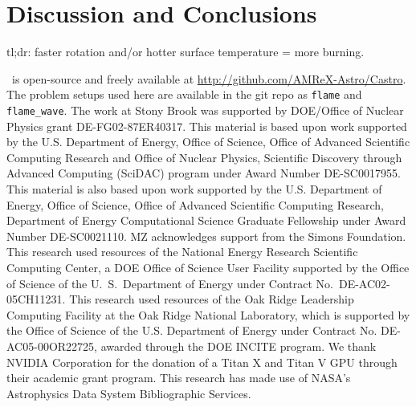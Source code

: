 \documentclass[preprint,times,tighten]{aastex63}
\newcommand{\castro}{{\sf Castro}}
\begin{document}
\section{Discussion and Conclusions}\label{Sec:conclusions}

tl;dr: faster rotation and/or hotter surface temperature = more burning.

\acknowledgements \castro\ is open-source and freely available at
\url{http://github.com/AMReX-Astro/Castro}.  The problem setups used
here are available in the git repo as {\tt flame} and {\tt
  flame\_wave}.  The work at Stony Brook was supported by DOE/Office
of Nuclear Physics grant DE-FG02-87ER40317.  This material is based upon work supported by the
U.S. Department of Energy, Office of Science, Office of Advanced
Scientific Computing Research and Office of Nuclear Physics, Scientific
Discovery through Advanced Computing (SciDAC) program under Award
Number DE-SC0017955.  This material is also based upon work supported by the U.S. Department
of Energy, Office of Science, Office of Advanced Scientific Computing Research, Department of
Energy Computational Science Graduate Fellowship under Award Number DE-SC0021110.
MZ acknowledges support from the Simons Foundation. 
This research used resources of the National Energy
Research Scientific Computing Center, a DOE Office of Science User
Facility supported by the Office of Science of the U.~S.\ Department
of Energy under Contract No.\ DE-AC02-05CH11231.  This research used
resources of the Oak Ridge Leadership Computing Facility at the Oak
Ridge National Laboratory, which is supported by the Office of Science
of the U.S. Department of Energy under Contract No. DE-AC05-00OR22725,
awarded through the DOE INCITE program.  We thank NVIDIA Corporation
for the donation of a Titan X and Titan V GPU through their academic
grant program.  This research has made use of NASA's Astrophysics Data
System Bibliographic Services.








\end{document}
